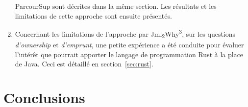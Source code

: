 \documentclass[a4paper]{report}
\newcommand{\jmlwhy}{\texorpdfstring{Jml\textsubscript{2}Why\textsuperscript{3}}{Jml2Why3}}
\begin{document}
\begin{enumerate}
  ParcourSup sont décrites dans la même section. Les résultats et les
  limitations de cette approche sont ensuite présentés.
\item Concernant les limitations de l'approche par \jmlwhy, sur les questions
  \emph{d'ownership} et \emph{d'emprunt}, une petite expérience a été conduite pour évaluer
  l'intérêt que pourrait apporter le langage de programmation Rust à la place de
  Java. Ceci est détaillé en section~\ref{sec:rust}.
\end{enumerate}

\section{Conclusions}
\label{sec:conclusions}
\end{document}
